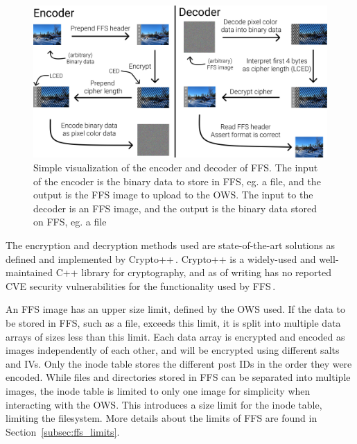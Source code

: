 \begin{figure}[!ht]
	\begin{center}
	  \includegraphics[width=1.0\textwidth]{figures.nosync/encoder_decoder.png}
	\end{center}
	\caption[Simple visualization of the encoder and decoder of \gls{FFS}]{Simple visualization of the encoder and decoder of \gls{FFS}. The input of the encoder is the binary data to store in \gls{FFS}, eg. a file, and the output is the \gls{FFS} image to upload to the \gls{OWS}. The input to the decoder is an \gls{FFS} image, and the output is the binary data stored on \gls{FFS}, eg. a file}
	\label{fig:file_enc_dec}
\end{figure}

The encryption and decryption methods used are \mbox{state-of-the-art} solutions as defined and implemented by Crypto++\,\cite{CryptoLibraryFree}. Crypto++ is a \mbox{widely-used} and \mbox{well-maintained} C++ library for cryptography, and as of writing has no reported CVE security vulnerabilities for the functionality used by \gls{FFS}\,\cite{CryptoppSecurityVulnerabilities}.

An \gls{FFS} image has an upper size limit, defined by the \gls{OWS} used. If the data to be stored in \gls{FFS}, such as a file, exceeds this limit, it is split into multiple data arrays of sizes less than this limit. Each data array is encrypted and encoded as images independently of each other, and will be encrypted using different salts and \gls{IV}s. Only the inode table stores the different post IDs in the order they were encoded. While files and directories stored in \gls{FFS} can be separated into multiple images, the inode table is limited to only one image for simplicity when interacting with the \gls{OWS}. This introduces a size limit for the inode table, limiting the filesystem. More details about the limits of \gls{FFS} are found in Section~\ref{subsec:ffs_limits}.

